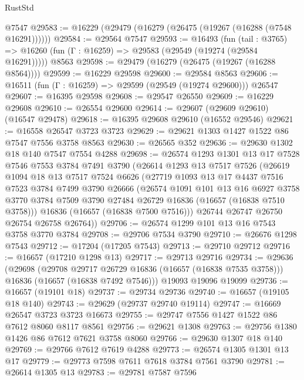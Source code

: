 \begin{lexlean}{RustStd}
\begin{coremodule}
    @7547
@29583 := @16229 (@29479 (@16279 (@26475 (@19267 (@16288 (@7548 @16291))))))
@29584 := @29564 @7547
@29593 := @16493
    (fun (tail : @3765) => @16260 (fun (Γ : @16259) => @29583 (@29549 (@19274 (@29584 @16291)))))
    @8563
@29598 := @29479 (@16279 (@26475 (@19267 (@16288 @8564))))
@29599 := @16229 @29598
@29600 := @29584 @8563
@29606 := @16511 (fun (Γ : @16259) => @29599 (@29549 (@19274 @29600))) @26547
@29607 := @16395 @29598
@29608 := @29547 @26550
@29609 := @16229 @29608
@29610 := @26554 @29600
@29614 := @29607 (@29609 @29610) (@16547 @29478)
@29618 := @16395 @29608 @29610 (@16552 @29546)
@29621 := @16558 @26547 @3723 @3723
@29629 := @29621 @1303 @1427 @1522 @86 @7547 @7556 @3758 @8563
@29630 := @26565 @352
@29636 := @29630 @1302 @18 @140 @7547 @7554 @4288
@29698 := @26574
    @1293
    @1301
    @13
    @17
    @7528
    @7546
    @7553
    @3784
    @7491
    @3790
    (@26614
      @1293
      @13
      @7517
      @7526
      (@26619
        @1094
        @18
        @13
        @7517
        @7524
        @6626
        (@27719
          @1093
          @13
          @17
          @4437
          @7516
          @7523
          @3784
          @7499
          @3790
          @26666
          (@26574
            @1091
            @101
            @13
            @16
            @6927
            @3758
            @3770
            @3784
            @7509
            @3790
            @27484
            @26729
            @16836
            (@16657 (@16838 @7510 @3758)))
          @16836
          (@16657 (@16838 @7500 @7516)))
        @26744
        @26747
        @26750
        @26754
        @26758
        @26764))
@29706 := @26574 @1299 @101 @13 @16 @7543 @3758 @3770 @3784
@29708 := @29706 @7534 @3790
@29710 := @26676 @1298 @7543
@29712 := @17204 (@17205 @7543)
@29713 := @29710 @29712
@29716 := @16657 (@17210 @1298 @13)
@29717 := @29713 @29716
@29734 := @29636
    (@29698
      (@29708 @29717 @26729 @16836 (@16657 (@16838 @7535 @3758)))
      @16836
      (@16657 (@16838 @7492 @7546)))
    @19093
    @19096
    @19099
@29736 := @16657 (@19101 @18)
@29737 := @29734 @29736
@29740 := @16657 (@19105 @18 @140)
@29743 := @29629 (@29737 @29740 @19114)
@29747 := @16669 @26547 @3723 @3723 @16673
@29755 := @29747 @7556 @1427 @1522 @86 @7612 @8060 @8117 @8561
@29756 := @29621 @1308
@29763 := @29756 @1380 @1426 @86 @7612 @7621 @3758 @8060
@29766 := @29630 @1307 @18 @140
@29769 := @29766 @7612 @7619 @4288
@29773 := @26574 @1305 @1301 @13 @17
@29779 := @29773 @7598 @7611 @7618 @3784 @7561 @3790
@29781 := @26614 @1305 @13
@29783 := @29781 @7587 @7596

\end{coremodule}
\end{lexlean}
